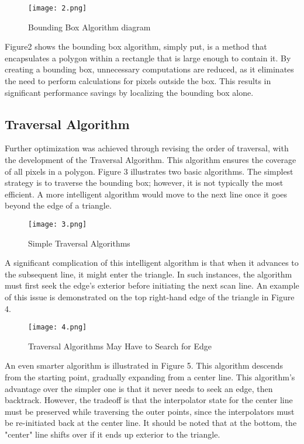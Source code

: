 \documentclass[
	a4paper, %
	10pt, %
	unnumberedsections, %
	twoside, %
]{LTJournalArticle}
\begin{document}
\begin{figure}[H] %
	\texttt{[image: 2.png]}
	\caption{Bounding Box Algorithm diagram}
\end{figure}

Figure2 shows the bounding box algorithm, simply put, is a method that encapsulates a polygon within a rectangle that is large enough to contain it.\cite{yunhong1999} By creating a bounding box, unnecessary computations are reduced, as it eliminates the need to perform calculations for pixels outside the box. This results in significant performance savings by localizing the bounding box alone.

\subsection{Traversal Algorithm}

Further optimization was achieved through revising the order of traversal, with the development of the Traversal Algorithm. This algorithm ensures the coverage of all pixels in a polygon. Figure 3 illustrates two basic algorithms. The simplest strategy is to traverse the bounding box; however, it is not typically the most efficient. A more intelligent algorithm would move to the next line once it goes beyond the edge of a triangle.

\begin{figure}[H] %
	\texttt{[image: 3.png]}
	\caption{Simple Traversal Algorithms}
\end{figure}

A significant complication of this intelligent algorithm is that when it advances to the subsequent line, it might enter the triangle. In such instances, the algorithm must first seek the edge's exterior before initiating the next scan line.\cite{pineda1988} An example of this issue is demonstrated on the top right-hand edge of the triangle in Figure 4.

\begin{figure}[H] %
	\texttt{[image: 4.png]}
	\caption{Traversal Algorithms May Have to Search for Edge}
\end{figure}

An even smarter algorithm is illustrated in Figure 5. This algorithm descends from the starting point, gradually expanding from a center line. This algorithm's advantage over the simpler one is that it never needs to seek an edge, then backtrack. However, the tradeoff is that the interpolator state for the center line must be preserved while traversing the outer points, since the interpolators must be re-initiated back at the center line. It should be noted that at the bottom, the "center" line shifts over if it ends up exterior to the triangle.
\end{document}
